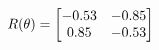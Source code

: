 \documentclass[preview]{standalone}
\begin{document}
\begin{align*}
\special{dvisvgm:raw <g id='unique000'>}R(\theta) = \begin{bmatrix}-0.53 & -0.85\\0.85 & -0.53\end{bmatrix}\special{dvisvgm:raw </g>}
\end{align*}
\end{document}
